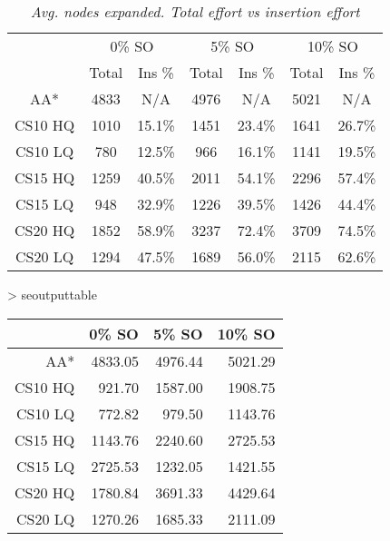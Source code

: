 \begin{table}[ht]
\caption{\small{\emph{Avg. nodes expanded. Total effort vs insertion effort}}}
\label{aha-table:searcheffort}
\begin{center}
\begin{tabular*}{0.48\textwidth}{@{\extracolsep{\fill}}ccccccc}%
  \hline
 & \multicolumn{2}{c}{\small{0\% SO}} & \multicolumn{2}{c}{\small{5\% SO}} & \multicolumn{2}{c}{\small{10\% SO}} \\
 & \small{Total} & \small{Ins \%} & \small{Total} & \small{Ins \%} & \small{Total} & \small{Ins \%} \\
  \hline
\small{AA*} & \small{4833 }& \small{N/A }& \small{4976 }& \small{N/A }& \small{5021} & \small{N/A }\\
\small{CS10 HQ }& \small{1010 }& \small{15.1\%} & \small{1451} & \small{23.4\% }& \small{1641 }& \small{26.7\% }\\
\small{CS10 LQ }& \small{780 }& \small{12.5\% }& \small{966 }& \small{16.1\% }& \small{1141 }& \small{19.5\% }\\
\small{CS15 HQ }& \small{1259 }& \small{40.5\%} & \small{2011 }& \small{54.1\% }& \small{2296 }& \small{57.4\%} \\
\small{CS15 LQ }& \small{948 }& \small{32.9\% }& \small{1226 }& \small{39.5\% }& \small{1426} & \small{44.4\% }\\
\small{CS20 HQ }& \small{1852} & \small{58.9\% }& \small{3237 }& \small{72.4\% }& \small{3709 }& \small{74.5\% }\\
\small{CS20 LQ }& \small{1294} & \small{47.5\% }& \small{1689 }& \small{56.0\% }& \small{2115 }& \small{62.6\% }\\
   \hline
\end{tabular*}
\end{center}
\end{table}
> seoutputtable
\begin{table}[ht]
\begin{center}
\begin{tabular}{rrrr}
  \hline
 & 0\% SO & 5\% SO & 10\% SO \\
  \hline
AA* & 4833.05 & 4976.44 & 5021.29 \\
  CS10 HQ & 921.70 & 1587.00 & 1908.75 \\
  CS10 LQ & 772.82 & 979.50 & 1143.76 \\
  CS15 HQ & 1143.76 & 2240.60 & 2725.53 \\
  CS15 LQ & 2725.53 & 1232.05 & 1421.55 \\
  CS20 HQ & 1780.84 & 3691.33 & 4429.64 \\
  CS20 LQ & 1270.26 & 1685.33 & 2111.09 \\
   \hline
\end{tabular}
\end{center}
\end{table}
